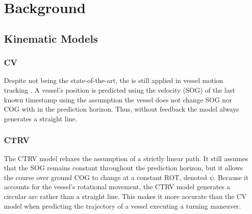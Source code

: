 \section{Background} 
\label{chap:background}
\subsection{Kinematic Models} 
    \subsubsection{CV}
    Despite not being the state-of-the-art, the %
    is still applied in vessel motion tracking  \parencite{8693856CV}. A vessel's position is predicted using the velocity (\ac{SOG}) of the last known timestamp using the assumption the vessel does not change \ac{SOG} nor \ac{COG} with in the prediction horizon. Thus, without feedback the model always generates a straight line.
    \subsubsection{CTRV}
    The \acf{CTRV} model relaxes the assumption of a strictly linear path. It still assumes that the \ac{SOG} remains constant throughout the prediction horizon, but it allows the course over ground \ac{COG} to change at a constant \acf{ROT}, denoted $\dot{\psi}$. Because it accounts for the vessel's rotational movement, the \ac{CTRV} model generates a circular arc rather than a straight line. This makes it  more accurate than the \ac{CV} model when predicting the trajectory of a vessel executing a turning maneuver.
    

